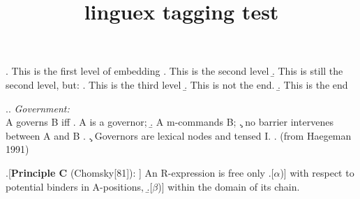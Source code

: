 \documentclass{article}
\title{linguex tagging test}
\begin{document}
\ex. This is the first level of embedding
    \a. This is the second level
    \b. This is still the second level, but:
        \a. This is the third level
        \b. This is not the end.
        \b. This is the end

\ex.\a. {\itshape Government:}\\
       A governs B iff
       \a. A is a governor;
       \b. A m-commands B;
       \c. no barrier intervenes between A and B
       \z.
   \c.    Governors are lexical nodes and tensed I.
       \z.
       (from Haegeman 1991)

\a.[{\bfseries Principle C} (Chomsky{[81]}): ] An R-expression is free only
      \a.[$\alpha$)] with respect to potential binders
             in A-positions,
      \b.[$\beta$)] within the domain of its chain.
\end{document}
